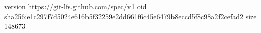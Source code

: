 version https://git-lfs.github.com/spec/v1
oid sha256:e1c297f7d5024e616b5f32259e2dd661f6c45e6479b8eccd5f8c98a2f2cefad2
size 148673
